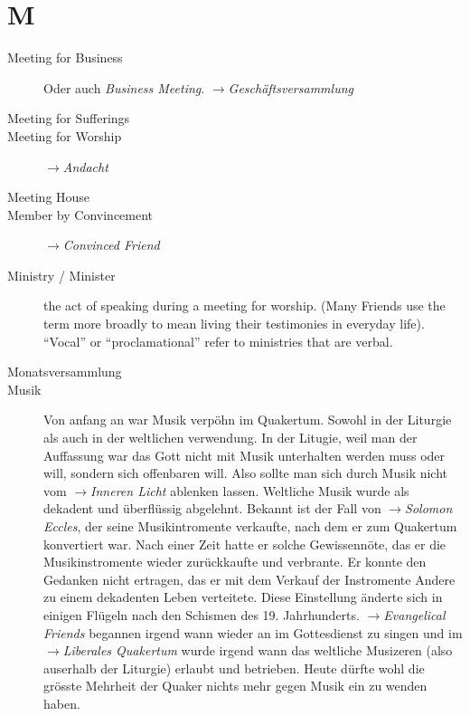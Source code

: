 \section*{M}

\articlesize

\begin{description}

 \item[Meeting for Business] Oder auch \textit{Business Meeting}.
 $\to$\textit{Geschäftsversammlung}

 \item[Meeting for Sufferings]
 
 \item[Meeting for Worship]  $\to$\textit{Andacht}

 \item[Meeting House]

 \item[Member by Convincement] $\to$\textit{Convinced Friend}
 
 \item[Ministry / Minister]
    the act of speaking during a meeting for worship. (Many Friends use the term more broadly to mean living their testimonies in everyday life). "`Vocal"' or "`proclamational"' refer to ministries that are verbal.
 
 \item[Monatsversammlung]
 
 \item[Musik] Von anfang an war Musik verpöhn im Quakertum. Sowohl in der Liturgie
 als auch in der weltlichen verwendung. In der Litugie, weil man der Auffassung war
 das Gott nicht mit Musik unterhalten werden muss oder will, sondern sich offenbaren
 will. Also sollte man sich durch Musik nicht vom $\to$\textit{Inneren Licht}
 ablenken lassen. Weltliche Musik wurde als dekadent und überflüssig abgelehnt.
 Bekannt ist der Fall von $\to$\textit{Solomon Eccles}, der seine Musikintromente
 verkaufte, nach dem er zum Quakertum konvertiert war. Nach einer Zeit hatte er
 solche Gewissennöte, das er die Musikinstromente wieder zurückkaufte und
 verbrante. Er konnte den Gedanken nicht ertragen, das er mit dem Verkauf der
 Instromente Andere zu einem dekadenten Leben verteitete. Diese Einstellung
 änderte sich in einigen Flügeln nach den Schismen des 19. Jahrhunderts.
 $\to$\textit{Evangelical Friends} begannen irgend wann wieder an im
 Gottesdienst zu singen und im $\to$\textit{Liberales Quakertum} wurde irgend
 wann das weltliche Musizeren (also auserhalb der Liturgie) erlaubt und
 betrieben. Heute dürfte wohl die grösste Mehrheit der Quaker nichts mehr
 gegen Musik ein zu wenden haben.

 \end{description}

\normalsize
